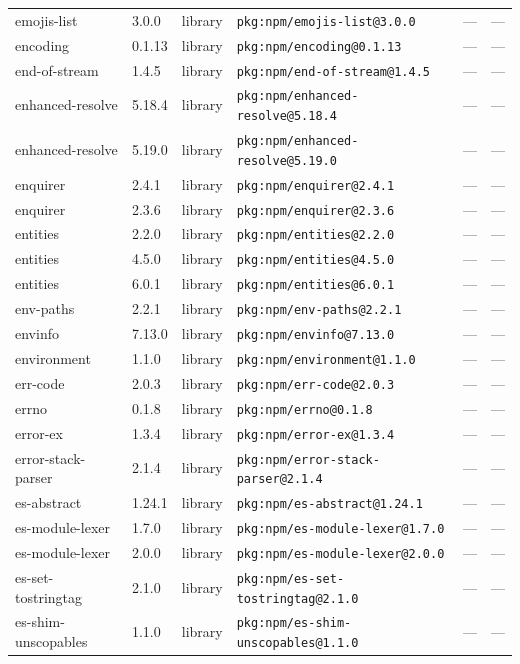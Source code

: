 \documentclass[11pt]{article}
\begin{document}
\begin{longtable}{|l|l|l|p{2.2cm}|l|p{4cm}|}
emojis-list & 3.0.0 & library & \texttt{pkg:npm/emojis-list@3.0.0} & — & — \\
encoding & 0.1.13 & library & \texttt{pkg:npm/encoding@0.1.13} & — & — \\
end-of-stream & 1.4.5 & library & \texttt{pkg:npm/end-of-stream@1.4.5} & — & — \\
enhanced-resolve & 5.18.4 & library & \texttt{pkg:npm/enhanced-resolve@5.18.4} & — & — \\
enhanced-resolve & 5.19.0 & library & \texttt{pkg:npm/enhanced-resolve@5.19.0} & — & — \\
enquirer & 2.4.1 & library & \texttt{pkg:npm/enquirer@2.4.1} & — & — \\
enquirer & 2.3.6 & library & \texttt{pkg:npm/enquirer@2.3.6} & — & — \\
entities & 2.2.0 & library & \texttt{pkg:npm/entities@2.2.0} & — & — \\
entities & 4.5.0 & library & \texttt{pkg:npm/entities@4.5.0} & — & — \\
entities & 6.0.1 & library & \texttt{pkg:npm/entities@6.0.1} & — & — \\
env-paths & 2.2.1 & library & \texttt{pkg:npm/env-paths@2.2.1} & — & — \\
envinfo & 7.13.0 & library & \texttt{pkg:npm/envinfo@7.13.0} & — & — \\
environment & 1.1.0 & library & \texttt{pkg:npm/environment@1.1.0} & — & — \\
err-code & 2.0.3 & library & \texttt{pkg:npm/err-code@2.0.3} & — & — \\
errno & 0.1.8 & library & \texttt{pkg:npm/errno@0.1.8} & — & — \\
error-ex & 1.3.4 & library & \texttt{pkg:npm/error-ex@1.3.4} & — & — \\
error-stack-parser & 2.1.4 & library & \texttt{pkg:npm/error-stack-parser@2.1.4} & — & — \\
es-abstract & 1.24.1 & library & \texttt{pkg:npm/es-abstract@1.24.1} & — & — \\
es-module-lexer & 1.7.0 & library & \texttt{pkg:npm/es-module-lexer@1.7.0} & — & — \\
es-module-lexer & 2.0.0 & library & \texttt{pkg:npm/es-module-lexer@2.0.0} & — & — \\
es-set-tostringtag & 2.1.0 & library & \texttt{pkg:npm/es-set-tostringtag@2.1.0} & — & — \\
es-shim-unscopables & 1.1.0 & library & \texttt{pkg:npm/es-shim-unscopables@1.1.0} & — & — \\

\end{longtable}
\end{document}
